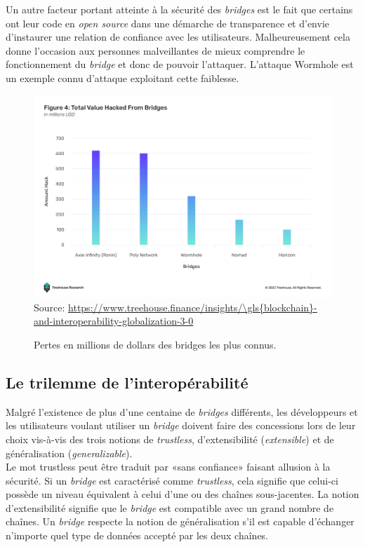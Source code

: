 Un autre facteur portant atteinte à la sécurité des \textit{bridges} est le fait que certains ont leur code en \textit{open source} dans une démarche de transparence et d’envie d’instaurer une relation de confiance avec les utilisateurs. Malheureusement cela donne l’occasion aux personnes malveillantes de mieux comprendre le fonctionnement du \textit{bridge} et donc de pouvoir l’attaquer. L’attaque Wormhole est un exemple connu d’attaque exploitant cette faiblesse.

\begin{figure}[h!]
    \centering
\includegraphics[scale=0.30]{centralisation/imagesBridges/GraphLossesBridges.png}
    {\scriptsize
            Source: \url{https://www.treehouse.finance/insights/\gls{blockchain}-and-interoperability-globalization-3-0}}
    \caption{Pertes en millions de dollars des bridges les plus connus.}
    \label{fig:GraphBridges}
\end{figure}

\subsection{Le trilemme de l’interopérabilité}

Malgré l’existence de plus d’une centaine de \textit{bridges} différents, les développeurs et les utilisateurs voulant utiliser un \textit{bridge} doivent faire des concessions lors de leur choix vis-à-vis des trois notions de \textit{trustless}, d’extensibilité (\textit{extensible}) et de généralisation (\textit{generalizable}).\\

Le mot trustless peut être traduit par «sans confiance» faisant allusion à la sécurité. Si un \textit{bridge} est caractérisé comme \textit{trustless}, cela signifie que celui-ci possède un niveau équivalent à celui d’une ou des chaînes sous-jacentes.  La notion  d’extensibilité signifie que le \textit{bridge} est compatible avec un grand nombre de chaînes.
Un \textit{bridge} respecte la notion de généralisation s’il est capable d'échanger n’importe quel type de données accepté par les deux chaînes.\\

